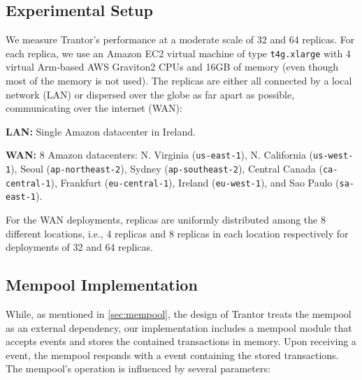 \documentclass{article}
\begin{document}
\subsection{Experimental Setup}

We measure Trantor's performance at a moderate scale of 32 and 64 replicas.
For each replica, we use an Amazon EC2 virtual machine of type \texttt{t4g.xlarge}
with 4 virtual Arm-based AWS Graviton2 CPUs and 16GB of memory (even though most of the memory is not used).
The replicas are either all connected by a local network (LAN) or dispersed over the globe as far apart as possible, communicating over the internet (WAN):
\begin{compactitem}
    \item \textbf{LAN:} Single Amazon datacenter in Ireland.
    \item \textbf{WAN:} 8 Amazon datacenters:
    N. Virginia (\texttt{us-east-1}),
    N. California (\texttt{us-west-1}),
    Seoul (\texttt{ap-northeast-2}),
    Sydney (\texttt{ap-southeast-2}),
    Central Canada (\texttt{ca-central-1}),
    Frankfurt (\texttt{eu-central-1}),
    Ireland (\texttt{eu-west-1}),
    and Sao Paulo (\texttt{sa-east-1}).
\end{compactitem}
For the WAN deployments, replicas are uniformly distributed among the 8 different locations,
i.e., 4 replicas and 8 replicas in each location respectively for deployments of 32 and 64 replicas.

\subsection{Mempool Implementation}

While, as mentioned in \cref{sec:mempool}, the design of Trantor treats the mempool as an external dependency,
our implementation includes a mempool module that accepts  events and stores the contained transactions in memory.
Upon receiving a  event, the mempool responds with a  event containing the stored transactions.
The mempool's operation is influenced by several parameters:
\end{document}
